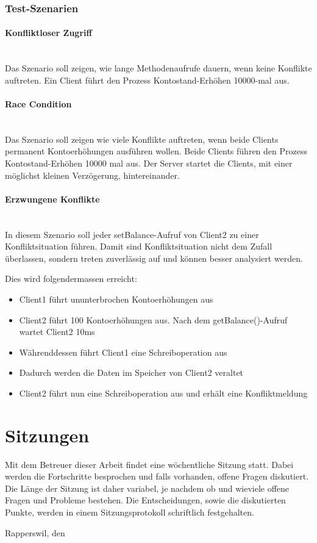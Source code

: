\documentclass{article}
\begin{document}
\subsubsection{Test-Szenarien}
\label{sec:test-szenarien}

\paragraph{Konfliktloser Zugriff}
\label{sec:konfl-zugr}
$~~$ \\
Das Szenario soll zeigen, wie lange Methodenaufrufe dauern, wenn keine Konflikte auftreten. Ein Client führt den Prozess Kontostand-Erhöhen 10000-mal aus.

\paragraph{Race Condition}
\label{sec:race-condition}
$~~$ \\
Das Szenario soll zeigen wie viele Konflikte auftreten, wenn beide Clients permanent Kontoerhöhungen ausführen wollen.
Beide Clients führen den Prozess Kontostand-Erhöhen 10000 mal aus. Der Server startet die Clients, mit einer möglichst kleinen Verzögerung, hintereinander. 

\paragraph{Erzwungene Konflikte}
\label{sec:erzwungene-konflikte}
$~~$ \\
In diesem Szenario soll jeder setBalance-Aufruf von Client2 zu einer Konfliktsituation führen. Damit sind Konfliktsituation nicht dem Zufall überlassen, sondern treten zuverlässig auf und können besser analysiert werden.

\noindent Dies wird folgendermassen erreicht:
\begin{itemize}
\item Client1 führt ununterbrochen Kontoerhöhungen aus
\item Client2 führt 100 Kontoerhöhungen aus. Nach dem getBalance()-Aufruf wartet Client2 10ms
\item Währenddessen führt Client1 eine Schreiboperation aus
\item Dadurch werden die Daten im Speicher von Client2 veraltet
\item Client2 führt nun eine Schreiboperation aus und erhält eine Konfliktmeldung
\end{itemize}

\section{Sitzungen}
Mit dem Betreuer dieser Arbeit findet eine wöchentliche Sitzung statt. Dabei werden die Fortschritte besprochen und falls vorhanden, offene Fragen diskutiert. Die Länge der Sitzung ist daher variabel, je nachdem ob und wieviele offene Fragen und Probleme bestehen. Die Entscheidungen, sowie die diskutierten Punkte, werden in einem Sitzungsprotokoll schriftlich festgehalten.


\vspace{2cm}

\noindent Rapperswil, den \date{\today} \\
\end{document}
